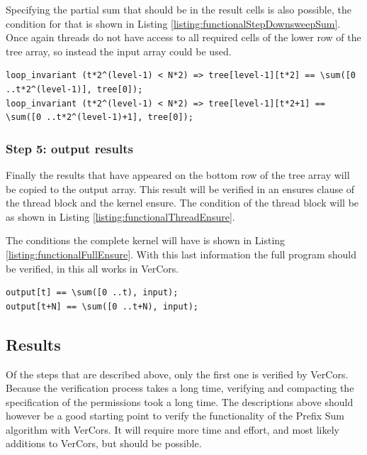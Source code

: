 \documentclass[a4paper]{article}
\begin{document}
Specifying the partial sum that should be in the result cells is also possible, the condition for that is shown in Listing \ref{listing:functionalStepDownsweepSum}. Once again threads do not have access to all required cells of the lower row of the tree array, so instead the input array could be used.

\begin{lstlisting}[caption=Downsweep summed results, label=listing:functionalStepDownsweepSum, float=htpb]
loop_invariant (t*2^(level-1) < N*2) => tree[level-1][t*2] == \sum([0 ..t*2^(level-1)], tree[0]);
loop_invariant (t*2^(level-1) < N*2) => tree[level-1][t*2+1] == \sum([0 ..t*2^(level-1)+1], tree[0]);
\end{lstlisting}

\subsubsection{Step 5: output results}
Finally the results that have appeared on the bottom row of the tree array will be copied to the output array. This result will be verified in an ensures clause of the thread block and the kernel ensure. The condition of the thread block will be as shown in Listing \ref{listing:functionalThreadEnsure}.

The conditions the complete kernel will have is shown in Listing \ref{listing:functionalFullEnsure}. With this last information the full program should be verified, in this all works in VerCors.

\begin{lstlisting}[caption={Ensures clause of the kernel, verifying the output array results}, label=listing:functionalThreadEnsure, float=htpb]
output[t] == \sum([0 ..t), input);
output[t+N] == \sum([0 ..t+N), input);
\end{lstlisting}

\subsection{Results}
Of the steps that are described above, only the first one is verified by VerCors. Because the verification process takes a long time, verifying and compacting the specification of the permissions took a long time. The descriptions above should however be a good starting point to verify the functionality of the Prefix Sum algorithm with VerCors. It will require more time and effort, and most likely additions to VerCors, but should be possible.


\end{document}
